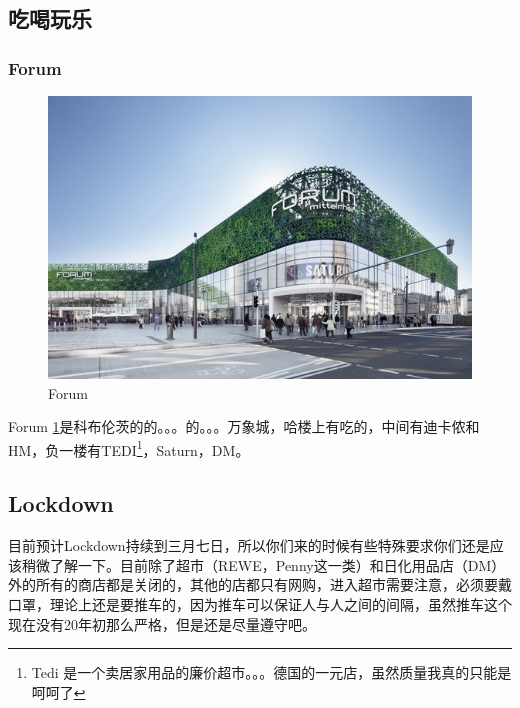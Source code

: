 \documentclass[doku]{subfiles}
\begin{document}
	\subsection{吃喝玩乐}
	\subsubsection{Forum}
	\begin{figure}
		\centering
		\includegraphics[width=0.6\linewidth]{forum}
		\caption{Forum}
		\label{fig:forum}
	\end{figure}
	
	Forum \ref{fig:forum}是科布伦茨的的。。。的。。。万象城，哈楼上有吃的，中间有迪卡侬和HM，负一楼有TEDI\footnote{Tedi 是一个卖居家用品的廉价超市。。。德国的一元店，虽然质量我真的只能是呵呵了}，Saturn，DM。
	
	\subsection{Lockdown}
	目前预计Lockdown持续到三月七日，所以你们来的时候有些特殊要求你们还是应该稍微了解一下。目前除了超市（REWE，Penny这一类）和日化用品店（DM）外的所有的商店都是关闭的，其他的店都只有网购，进入超市需要注意，必须要戴口罩，理论上还是要推车的，因为推车可以保证人与人之间的间隔，虽然推车这个现在没有20年初那么严格，但是还是尽量遵守吧。\label{lockdown-markt}
	
\end{document}
